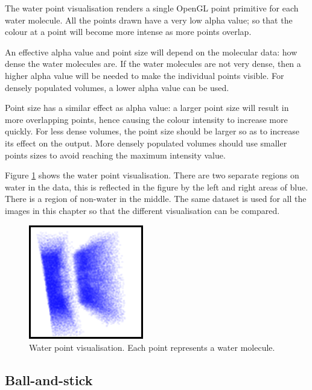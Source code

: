 The water point visualisation renders a single OpenGL point primitive for each
water molecule. All the points drawn have a very low alpha value; so that the
colour at a point will become more intense as more points overlap.

An effective alpha value and point size will depend on the molecular data: how
dense the water molecules are. If the water molecules are not very dense, then
a higher alpha value will be needed to make the individual points visible. For
densely populated volumes, a lower alpha value can be used.

Point size has a similar effect as alpha value: a larger point size will result
in more overlapping points, hence causing the colour intensity to increase more
quickly. For less dense volumes, the point size should be larger so as to
increase its effect on the output. More densely populated volumes should use
smaller points sizes to avoid reaching the maximum intensity value.

Figure \ref{fig:implementation_waterpoint} shows the water point visualisation.
There are two separate regions on water in the data, this is reflected in the
figure by the left and right areas of blue. There is a region of non-water in
the middle. The same dataset is used for all the images in this chapter so that
the different visualisation can be compared.

\begin{figure}
  \begin{center}
    \includegraphics[width=50mm]{waterpoint}
  \end{center}
  \caption{Water point visualisation. Each point represents a water molecule.}
  \label{fig:implementation_waterpoint}
\end{figure}


\subsection*{Ball-and-stick}

